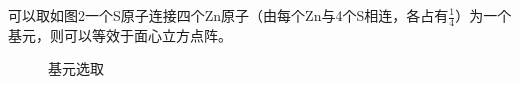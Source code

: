 \documentclass{article}
\begin{document}
可以取如图2一个S原子连接四个Zn原子（由每个Zn与4个S相连，各占有$  \frac{1}{4} $）为一个基元，则可以等效于面心立方点阵。
\begin{figure}[!h]
	\centering
	\caption{\heiti{}基元选取}
	
\end{figure}
\end{document}
